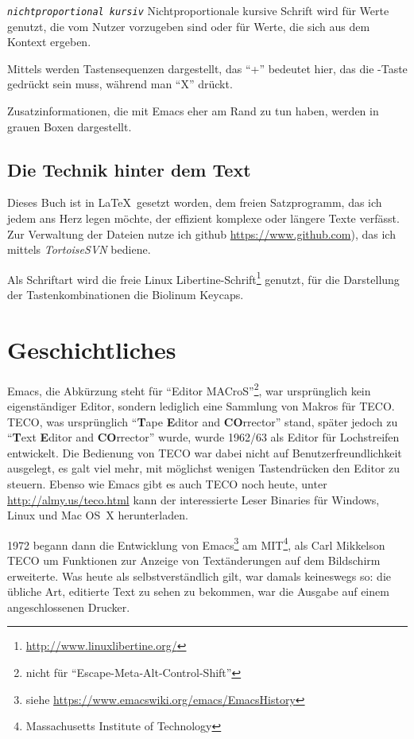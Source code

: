 \documentclass[12pt,ngerman]{scrbook}
\begin{document}
\texttt{\textit{nichtproportional kursiv}} Nichtproportionale kursive Schrift wird für Werte genutzt, die vom Nutzer vorzugeben sind oder für Werte, die sich aus dem Kontext ergeben.

Mittels   werden Tastensequenzen dargestellt, das \enquote{+} bedeutet hier, das die \LKeyStrg-Taste gedrückt sein muss, während man \enquote{X} drückt.

Zusatzinformationen, die mit Emacs eher am Rand zu tun haben, werden in grauen Boxen dargestellt.

\section*{Die Technik hinter dem Text}

Dieses Buch ist in \LaTeX\ gesetzt worden, dem freien Satzprogramm, das ich jedem ans Herz legen möchte, der effizient komplexe oder längere Texte verfässt. Zur Verwaltung der Dateien nutze ich github \url{https://www.github.com}), das ich mittels \textit{TortoiseSVN} bediene. 

Als Schriftart wird die freie Linux Libertine-Schrift\footnote{\url{http://www.linuxlibertine.org/}} genutzt, für die Darstellung der Tastenkombinationen die Biolinum Keycaps.



\mainmatter

\chapter{Geschichtliches}

Emacs, die Abkürzung steht für \enquote{Editor MACroS}\footnote{nicht für \enquote{Escape-Meta-Alt-Control-Shift}}, war ursprünglich kein eigenständiger Editor, sondern lediglich eine Sammlung von Makros für TECO. 
TECO, was ursprünglich \enquote{\textbf{T}ape \textbf{E}ditor and \textbf{CO}rrector} stand, später jedoch zu \enquote{\textbf{T}ext \textbf{E}ditor and \textbf{CO}rrector} wurde, wurde 1962/63 als Editor für Lochstreifen entwickelt. 
Die Bedienung von TECO war dabei nicht auf Benutzerfreundlichkeit ausgelegt, es galt viel mehr, mit möglichst wenigen Tastendrücken den Editor zu steuern. 
Ebenso wie Emacs gibt es auch TECO noch heute, unter \url{http://almy.us/teco.html} kann der interessierte Leser Binaries für Windows, Linux und Mac OS~X herunterladen. 

1972 begann dann die Entwicklung von Emacs\footnote{siehe \url{https://www.emacswiki.org/emacs/EmacsHistory}} am MIT\footnote{Massachusetts Institute of Technology}, als Carl Mikkelson TECO um Funktionen zur Anzeige von Textänderungen auf dem Bildschirm erweiterte. 
Was heute als selbstverständlich gilt, war damals keineswegs so: die übliche Art, editierte Text zu sehen zu bekommen, war die Ausgabe auf einem angeschlossenen Drucker.
\end{document}
